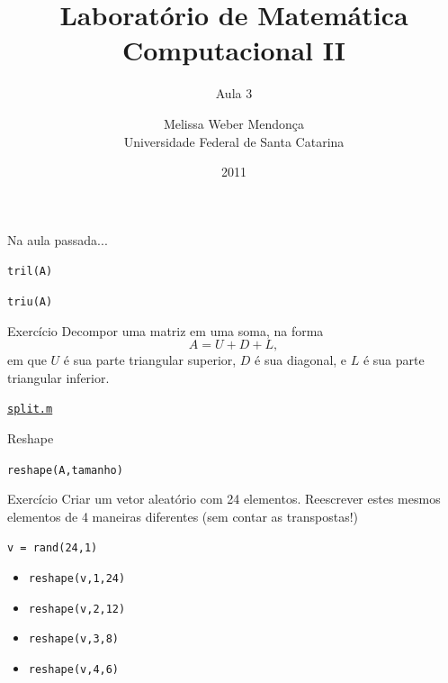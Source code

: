 \documentclass[hyperref={pdfpagelabels=false}]{beamer}
\title{Laboratório de Matemática Computacional II}
\subtitle{Aula 3}
\author[M. Weber Mendonça]{Melissa Weber Mendonça\\
Universidade Federal de Santa Catarina}
\date{2011}
\begin{document}
\setmonofont{Inconsolata}

\begin{frame}
  \titlepage
\end{frame}

\begin{frame}{Na aula passada...}
   \begin{center} {\texttt{tril(A)}} \end{center}
   \begin{center} {\texttt{triu(A)}} \end{center}
\end{frame}

\begin{frame}{Exercício}
   Decompor uma matriz em uma soma, na forma
   $$A = U+D+L,$$
   em que $U$ é sua parte triangular superior, $D$ é sua diagonal, e $L$ é sua
   parte triangular inferior.
   \vfill
   \begin{center} \href{listings/split.m}{\underline{\texttt{split.m}}} \end{center}
\end{frame}

\begin{frame}{Reshape}
  \begin{center} {\texttt{reshape(A,tamanho)}} \end{center}
\end{frame}

\begin{frame}{Exercício}
  Criar um vetor aleatório com 24 elementos. Reescrever estes mesmos
  elementos de 4 maneiras diferentes (sem contar as transpostas!)
  \begin{center} \texttt{v = rand(24,1)} \end{center}
  \begin{itemize}
  \item {\texttt{reshape(v,1,24)}} 
  \item {\texttt{reshape(v,2,12)}} 
  \item {\texttt{reshape(v,3,8)}} 
  \item {\texttt{reshape(v,4,6)}} 
  \end{itemize}
\end{frame}
\end{document}
